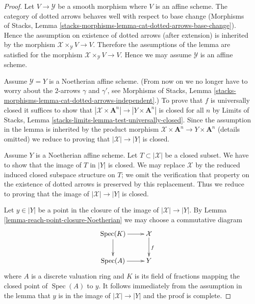 \documentclass{stacks-project}
\theoremstyle{plain}
\theoremstyle{definition}
\theoremstyle{remark}
\numberwithin{equation}{subsection}
\def\Spec{\mathop{\mathrm{Spec}}}
\begin{document}
\begin{proof}
Let $V \to \mathcal{Y}$ be a smooth morphism where $V$ is an affine scheme.
The category of dotted arrows behaves well with respect to base change
(Morphisms of Stacks, Lemma
\ref{stacks-morphisms-lemma-cat-dotted-arrows-base-change}).
Hence the assumption on existence of dotted arrows (after extension)
is inherited by the morphism $\mathcal{X} \times_\mathcal{Y} V \to V$.
Therefore the assumptions of the lemma are satisfied for the morphism
$\mathcal{X} \times_\mathcal{Y} V \to V$.
Hence we may assume $\mathcal{Y}$ is an affine scheme.

\medskip\noindent
Assume $\mathcal{Y} = Y$ is a Noetherian affine scheme.
(From now on we no longer have to worry about the
$2$-arrows $\gamma$ and $\gamma'$, see Morphisms of Stacks, Lemma
\ref{stacks-morphisms-lemma-cat-dotted-arrows-independent}.)
To prove that $f$ is universally closed it suffices to show that
$|\mathcal{X} \times \mathbf{A}^n| \to |Y \times \mathbf{A}^n|$ is closed
for all $n$ by Limits of Stacks, Lemma
\ref{stacks-limits-lemma-test-universally-closed}. Since the assumption
in the lemma is inherited by the product morphism
$\mathcal{X} \times \mathbf{A}^n \to Y \times \mathbf{A}^n$ (details omitted)
we reduce to proving that $|\mathcal{X}| \to |Y|$ is closed.

\medskip\noindent
Assume $Y$ is a Noetherian affine scheme.
Let $T \subset |\mathcal{X}|$ be a closed subset. We have to show that
the image of $T$ in $|Y|$ is closed. We may replace $\mathcal{X}$
by the reduced induced closed subspace structure on $T$; we
omit the verification that property on the existence of
dotted arrows is preserved by this replacement.
Thus we reduce to proving that the image
of $|\mathcal{X}| \to |Y|$ is closed.

\medskip\noindent
Let $y \in |Y|$ be a point in the closure of the image of
$|\mathcal{X}| \to |Y|$. By Lemma \ref{lemma-reach-point-closure-Noetherian}
we may choose a commutative diagram
$$
\xymatrix{
\Spec(K) \ar[r] \ar[d] & \mathcal{X} \ar[d]^f \\
\Spec(A) \ar[r] & Y
}
$$
where $A$ is a discrete valuation ring and $K$ is its field of fractions
mapping the closed point of $\Spec(A)$ to $y$. It follows immediately
from the assumption in the lemma that $y$ is in the image of
$|\mathcal{X}| \to |Y|$ and the proof is complete.
\end{proof}
\end{document}
